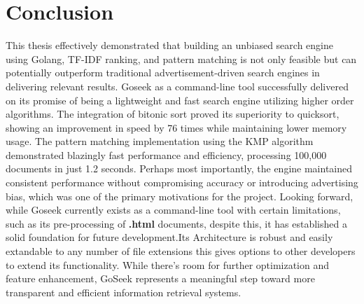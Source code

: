 \chapter{Conclusion}
This thesis effectively demonstrated that building an unbiased search engine using Golang, TF-IDF ranking, and pattern matching is not only feasible but can potentially outperform traditional advertisement-driven search engines in delivering relevant results. Goseek as a command-line tool successfully delivered on its promise of being a lightweight and fast search engine utilizing higher order algorithms.
The integration of bitonic sort proved its superiority to quicksort, showing an improvement in speed by 76 times while maintaining lower memory usage. The pattern matching implementation using the KMP algorithm demonstrated blazingly fast performance and efficiency, processing 100,000 documents in just 1.2 seconds. Perhaps most importantly, the engine maintained consistent performance without compromising accuracy or introducing advertising bias, which was one of the primary motivations for the project.
Looking forward, while Goseek currently exists as a command-line tool with certain limitations, such as its pre-processing of \textbf{.html} documents, despite this, it has established a solid foundation for future development.Its Architecture is robust and easily extandable to any number of file extensions this gives options to other developers to extend its functionality. While there's room for further optimization and feature enhancement,
GoSeek represents a meaningful step toward more transparent and efficient information retrieval systems.








